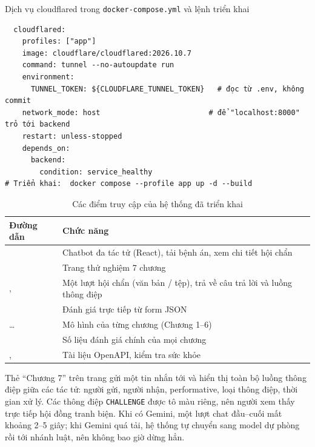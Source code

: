 \begin{code}{Dịch vụ cloudflared trong \texttt{docker-compose.yml} và lệnh triển khai}
\label{lst:ch7-compose}
\begin{verbatim}
  cloudflared:
    profiles: ["app"]
    image: cloudflare/cloudflared:2026.10.7
    command: tunnel --no-autoupdate run
    environment:
      TUNNEL_TOKEN: ${CLOUDFLARE_TUNNEL_TOKEN}   # đọc từ .env, không commit
    network_mode: host                         # để "localhost:8000" trỏ tới backend
    restart: unless-stopped
    depends_on:
      backend:
        condition: service_healthy
# Triển khai:  docker compose --profile app up -d --build
\end{verbatim}
\end{code}

\begin{table}[H]
\centering
\caption{Các điểm truy cập của hệ thống đã triển khai}
\label{tab:endpoints}
\small
\begin{tabularx}{\linewidth}{@{}L{5.4cm}Y@{}}
\toprule
\textbf{Đường dẫn} & \textbf{Chức năng} \\
\midrule
\api{/} & Chatbot đa tác tử (React), tải bệnh án, xem chi tiết hội chẩn \\
 & Trang thử nghiệm 7 chương \\
,  & Một lượt hội chẩn (văn bản / tệp), trả về câu trả lời và luồng thông điệp \\
 & Đánh giá trực tiếp từ form JSON \\
 …  & Mô hình của từng chương (Chương 1–6) \\
 & Số liệu đánh giá chính của mọi chương \\
,  & Tài liệu OpenAPI, kiểm tra sức khỏe \\
\bottomrule
\end{tabularx}
\end{table}

Thẻ ``Chương 7'' trên trang  gửi một tin nhắn tới  và hiển thị toàn bộ luồng thông điệp giữa các tác tử: người gửi, người nhận, performative, loại thông điệp, thời gian xử lý. Các thông điệp \texttt{CHALLENGE} được tô màu riêng, nên người xem thấy trực tiếp hội đồng tranh biện. Khi có Gemini, một lượt chat đầu–cuối mất khoảng 2–5 giây; khi Gemini quá tải, hệ thống tự chuyển sang model dự phòng rồi tới nhánh luật, nên không bao giờ dừng hẳn.


